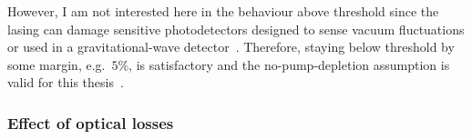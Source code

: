 However, I am not interested here in the behaviour above threshold since the lasing can damage sensitive photodetectors designed to sense vacuum fluctuations or used in a gravitational-wave detector~\cite{}. Therefore, staying below threshold by some margin, e.g.\ $5\%$, is satisfactory and the no-pump-depletion assumption is valid for this thesis~\cite{}. %

\subsubsection{Effect of optical losses}

